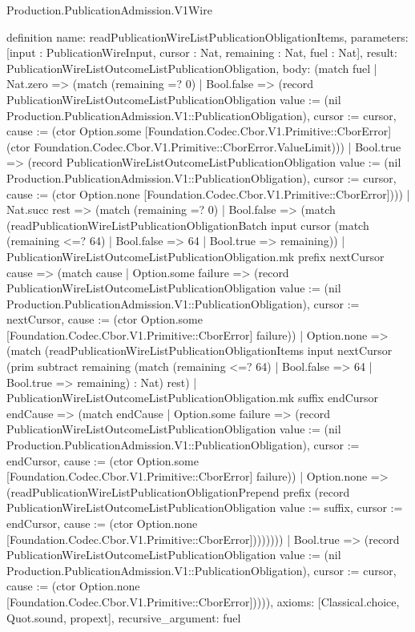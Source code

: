 \begin{lexlean}{Production.PublicationAdmission.V1Wire}
\begin{semanticmodule}
definition{
  name: readPublicationWireListPublicationObligationItems,
  parameters: [input : PublicationWireInput, cursor : Nat, remaining : Nat, fuel : Nat],
  result: PublicationWireListOutcomeListPublicationObligation,
  body: (match fuel
    | Nat.zero => (match (remaining =? 0)
      | Bool.false => (record PublicationWireListOutcomeListPublicationObligation {value := (nil Production.PublicationAdmission.V1::PublicationObligation), cursor := cursor, cause := (ctor Option.some [Foundation.Codec.Cbor.V1.Primitive::CborError] (ctor Foundation.Codec.Cbor.V1.Primitive::CborError.ValueLimit))})
      | Bool.true => (record PublicationWireListOutcomeListPublicationObligation {value := (nil Production.PublicationAdmission.V1::PublicationObligation), cursor := cursor, cause := (ctor Option.none [Foundation.Codec.Cbor.V1.Primitive::CborError])}))
    | Nat.succ rest => (match (remaining =? 0)
      | Bool.false => (match (readPublicationWireListPublicationObligationBatch input cursor (match (remaining <=? 64)
          | Bool.false => 64
          | Bool.true => remaining))
        | PublicationWireListOutcomeListPublicationObligation.mk prefix nextCursor cause => (match cause
          | Option.some failure => (record PublicationWireListOutcomeListPublicationObligation {value := (nil Production.PublicationAdmission.V1::PublicationObligation), cursor := nextCursor, cause := (ctor Option.some [Foundation.Codec.Cbor.V1.Primitive::CborError] failure)})
          | Option.none => (match (readPublicationWireListPublicationObligationItems input nextCursor (prim subtract remaining (match (remaining <=? 64)
              | Bool.false => 64
              | Bool.true => remaining) : Nat) rest)
            | PublicationWireListOutcomeListPublicationObligation.mk suffix endCursor endCause => (match endCause
              | Option.some failure => (record PublicationWireListOutcomeListPublicationObligation {value := (nil Production.PublicationAdmission.V1::PublicationObligation), cursor := endCursor, cause := (ctor Option.some [Foundation.Codec.Cbor.V1.Primitive::CborError] failure)})
              | Option.none => (readPublicationWireListPublicationObligationPrepend prefix (record PublicationWireListOutcomeListPublicationObligation {value := suffix, cursor := endCursor, cause := (ctor Option.none [Foundation.Codec.Cbor.V1.Primitive::CborError])}))))))
      | Bool.true => (record PublicationWireListOutcomeListPublicationObligation {value := (nil Production.PublicationAdmission.V1::PublicationObligation), cursor := cursor, cause := (ctor Option.none [Foundation.Codec.Cbor.V1.Primitive::CborError])}))),
  axioms: [Classical.choice, Quot.sound, propext],
  recursive_argument: fuel
}


\end{semanticmodule}
\end{lexlean}

